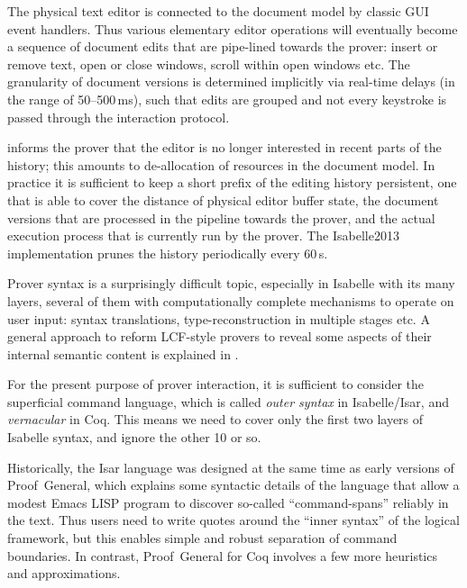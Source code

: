 \begin{isabellebody}
\begin{isamarkuptext}
  The physical text editor is connected to the document model by
  classic GUI event handlers.  Thus various elementary editor
  operations will eventually become a sequence of document edits that
  are pipe-lined towards the prover: insert or remove text, open or
  close windows, scroll within open windows etc.  The granularity of
  document versions is determined implicitly via real-time delays (in
  the range of 50--500\,ms), such that edits are grouped and not every
  keystroke is passed through the interaction protocol.

  \medskip {} informs the prover that
  the editor is no longer interested in recent parts of the history;
  this amounts to de-allocation of resources in the document model.
  In practice it is sufficient to keep a short prefix of the editing
  history persistent, one that is able to cover the distance of
  physical editor buffer state, the document versions that are
  processed in the pipeline towards the prover, and the actual
  execution process that is currently run by the prover.  The
  Isabelle2013 implementation prunes the history periodically every
  60\,s.%
\end{isamarkuptext}%
\isamarkuptrue%
%
\isamarkuptrue%
%
\isamarkuptrue%
%
\begin{isamarkuptext}%
Prover syntax is a surprisingly difficult topic, especially in
  Isabelle with its many layers, several of them with computationally
  complete mechanisms to operate on user input: syntax translations,
  type-reconstruction in multiple stages etc.  A general approach to
  reform LCF-style provers to reveal some aspects of their internal
  semantic content is explained in \cite{Wenzel:2011:CICM}.

  For the present purpose of prover interaction, it is sufficient to
  consider the superficial command language, which is called
  \emph{outer syntax} in Isabelle/Isar, and \emph{vernacular} in Coq.
  This means we need to cover only the first two layers of Isabelle
  syntax, and ignore the other 10 or so.

  Historically, the Isar language was designed at the same time as
  early versions of Proof~General, which explains some syntactic
  details of the language that allow a modest Emacs LISP program to
  discover so-called ``command-spans'' reliably in the text.  Thus
  users need to write quotes around the ``inner syntax'' of the
  logical framework, but this enables simple and robust separation of
  command boundaries.  In contrast, Proof~General for Coq involves a
  few more heuristics and approximations.


\end{isamarkuptext}
\end{isabellebody}
